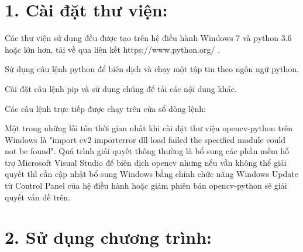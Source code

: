 \documentclass[../the.tex]{subfiles}
\begin{document}
\thispagestyle{empty}
\section*{1. Cài đặt thư viện:}
\label{set_lib}
{\fontsize{13}{12} \selectfont
Các thư viện sử dụng đều được tạo trên hệ điều hành Windows 7 và python 3.6 hoặc lớn hơn, tải về qua liên kết https://www.python.org/ .
\bigskip

\begin{itemize}
    \begin{item}
		Sử dụng câu lệnh python để biên dịch và chạy một tập tin theo ngôn ngữ python.
    \end{item}
    \begin{item}
		Cài đặt câu lệnh pip và sử dụng chúng để tải các nội dung khác.
    \end{item}
    \begin{item}
		Các câu lệnh trực tiếp được chạy trên cửa sổ dòng lệnh:
    \end{item}
\end{itemize}

\bigskip

	Một trong những lỗi tốn thời gian nhất khi cài đặt thư viện opencv-python trên Windows là "import cv2 importerror dll load failed the specified module could not be found". Quá trình giải quyết thông thường là bổ sung các phần mềm hỗ trợ Microsoft Visual Studio để biên dịch opencv nhưng nếu vẫn không thể giải quyết thì cần cập nhật bổ sung Windows bằng chính chức năng Windows Update từ Control Panel của hệ điều hành hoặc giảm phiên bản opencv-python sẽ giải quyết vấn đề trên.}
\bigskip

\section*{2. Sử dụng chương trình:}
\label{use_prog}
\end{document}

